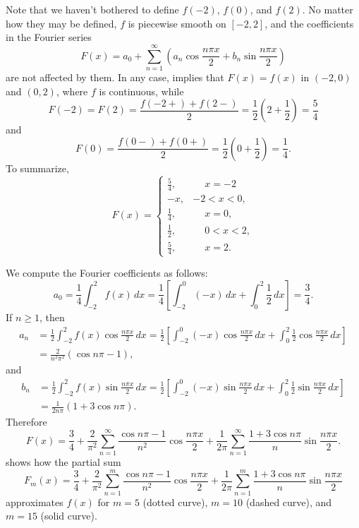 \begin{solution}
Note that we haven't bothered to define $f(-2)$, $f(0)$, and
$f(2)$.
 No matter
how they may be defined, $f$ is piecewise smooth on $[-2,2]$, and
the coefficients in the Fourier series
\[
F(x)=a_0+\sum_{n=1}^\infty\left(a_n\cos\frac{n\pi
x}{2}+b_n\sin\frac{n\pi x}{2}\right)
\]
are not affected by them. In any case,
 implies that $F(x)=f(x)$ in $(-2,0)$
and $(0,2)$, where $f$ is continuous, while
\[
F(-2)=F(2)=\frac{f(-2+)+f(2-)}{2}=
\frac{1}{2}\left(2+\frac{1}{2}\right)=\frac{5}{4}
\]
and
\[
F(0)=\frac{f(0-)+f(0+)}{2}=\frac{1}{2}\left(0+\frac{1}{2}\right)=\frac{1}{4}.
\]
To summarize,
\[
F(x)=
\begin{cases}
\frac{5}{4},&\phantom{-}x=-2\\
-x,&-2<x<0,\\
 \frac{1}{4},&\phantom{-}x=0,\\
\frac{1}{2},&\phantom{-}0<x<2,\\
\frac{5}{4},&\phantom{-}x=2.
\end{cases}
\]

We compute the Fourier coefficients as follows:
\[
a_0=\frac{1}{4}\int_{-2}^2f(x)\,dx=\frac{1}{4}\left[\int_{-2}^0(-x)\,dx
+\int_0^2\frac{1}{2}\,dx\right]
=\frac{3}{4}.
\]
If $n\ge1$, then
\begin{align*}
a_n&=\frac{1}{2}\int_{-2}^2f(x)\cos\frac{n\pi x}{2}\,dx
=\frac{1}{2}\left[\int_{-2}^0(-x)\cos\frac{n\pi x}{2}\,dx
+\int_0^2\frac{1}{2}\cos\frac{n\pi x}{2}\,dx\right]\\
&=\frac{2}{n^2\pi^2}(\cos n\pi-1),
\end{align*}
and
\begin{align*}
b_n&=\frac{1}{2}\int_{-2}^2f(x)\sin\frac{n\pi x}{2}\,dx
=\frac{1}{2}\left[\int_{-2}^0(-x)\sin\frac{n\pi x}{2}\,dx
+\int_0^2\frac{1}{2}\sin\frac{n\pi x}{2}\,dx\right]\\
&=\frac{1}{2n\pi}(1+3\cos n\pi).
\end{align*}
Therefore
\[
F(x)=\frac{3}{4}+\frac{2}{\pi^2}\sum_{n=1}^\infty\frac{\cos n\pi-1}{n^2}\cos\frac{n\pi x}{2}+\frac{1}{2\pi}\sum_{n=1}^\infty\frac{1+3\cos
n\pi}{n}\sin\frac{n\pi x}{2}.
\]
 shows how the partial sum
\[
F_m(x)=\frac{3}{4}+\frac{2}{\pi^2}\sum_{n=1}^m\frac{\cos n\pi-1}{n^2}\cos\frac{n\pi x}{2}+\frac{1}{2\pi}\sum_{n=1}^m\frac{1+3\cos
n\pi}{n}\sin\frac{n\pi x}{2}
\]
approximates $f(x)$ for $m=5$ (dotted curve), $m=10$  (dashed curve),
and $m=15$ (solid curve).
\end{solution}


